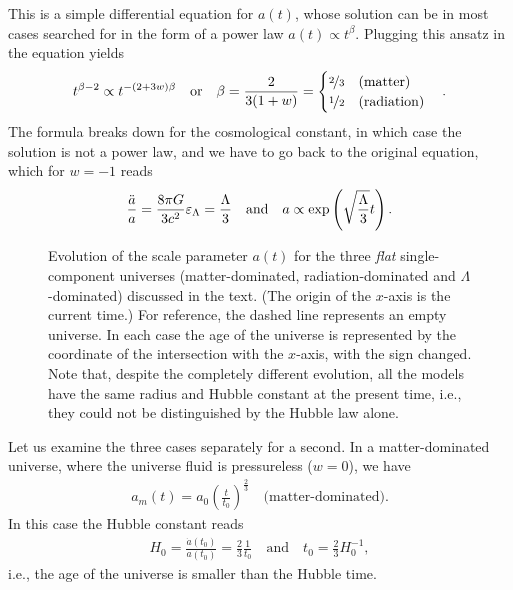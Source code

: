 This is a simple differential equation for $a(t)$, whose solution can be in most
cases searched for in the form of a power law $a(t) \propto t^\beta$. Plugging this
ansatz in the equation yields
\begin{align*}
  t^{\beta - 2} \propto t^{-(2 + 3w)\beta}
  \quad \text{or} \quad
  \beta = \frac{2}{3(1 + w)} =
  \begin{cases}
    \nicefrac{2}{3} \quad\text{(matter)}\\
    \nicefrac{1}{2}\quad\text{(radiation)}
  \end{cases}.
\end{align*}
The formula breaks down for the cosmological constant, in which case the solution
is not a power law, and we have to go back to the original equation, which for
$w = -1$ reads
\begin{align*}
  \frac{\ddot{a}}{a} = \frac{8\pi G}{3c^2} \varepsilon_\Lambda = \frac{\Lambda}{3}
  \quad \text{and} \quad
  a \propto \exp\left(\sqrt{\frac{\Lambda}{3}} t\right).
\end{align*}

\begin{figure}[!htbp]
  
  \caption{Evolution of the scale parameter $a(t)$ for the three \emph{flat}
    single-component universes (matter-dominated, radiation-dominated and
    $\Lambda$-dominated) discussed in the text. (The origin of the $x$-axis is the
    current time.) For reference, the dashed line represents an empty universe.
    In each case the age of the universe is represented by the coordinate of the
    intersection with the $x$-axis, with the sign changed. Note that, despite the
    completely different evolution, all the models have the same radius and Hubble
    constant at the present time, i.e., they could not be distinguished by the
    Hubble law alone.}
  \label{fig:single_component_scale}
\end{figure}

Let us examine the three cases separately for a second. In a matter-dominated
universe, where the universe fluid is pressureless ($w = 0$), we have
\begin{align}
  a_m(t) = a_0 \left( \frac{t}{t_0} \right)^\frac{2}{3}
  \quad\text{(matter-dominated)}.
\end{align}
In this case the Hubble constant reads
\begin{align*}
  H_0 = \frac{\dot{a}(t_0)}{a(t_0)} = \frac{2}{3} \frac{1}{t_0}
  \quad\text{and}\quad
  t_0 = \frac{2}{3} H_0^{-1},
\end{align*}
i.e., the age of the universe is smaller than the Hubble time.

